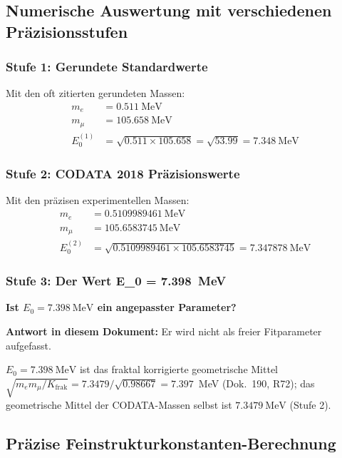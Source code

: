 	\subsection{Numerische Auswertung mit verschiedenen Präzisionsstufen}
	
	\subsubsection{Stufe 1: Gerundete Standardwerte}
	Mit den oft zitierten gerundeten Massen:
	\begin{align}
		m_e &= \SI{0.511}{\MeV} \\
		m_\mu &= \SI{105.658}{\MeV} \\
		E_0^{(1)} &= \sqrt{0.511 \times 105.658} = \sqrt{53.99} = \SI{7.348}{\MeV}
	\end{align}
	
	\subsubsection{Stufe 2: CODATA 2018 Präzisionswerte}
	Mit den präzisen experimentellen Massen:
	\begin{align}
		m_e &= \SI{0.5109989461}{\MeV} \\
		m_\mu &= \SI{105.6583745}{\MeV} \\
		E_0^{(2)} &= \sqrt{0.5109989461 \times 105.6583745} = \SI{7.347878}{\MeV}
	\end{align}
	
	\subsubsection{Stufe 3: Der Wert E\_0 = \SI{7.398}{\MeV}}
	
	\begin{tcolorbox}[colback=yellow!10!white,colframe=orange!75!black,title=Kritische Frage]
		\textbf{Ist $E_0 = \SI{7.398}{\MeV}$ ein angepasster Parameter?}
		
		\textbf{Antwort in diesem Dokument:} Er wird nicht als freier Fitparameter aufgefasst.
		
		$E_0 = \SI{7.398}{\MeV}$ ist das fraktal korrigierte geometrische Mittel $\sqrt{m_e m_\mu/K_{\text{frak}}} = 7.3479/\sqrt{0.98667} = 7.397$~MeV (Dok.~190, R72); das geometrische Mittel der CODATA-Massen selbst ist $\SI{7.3479}{\MeV}$ (Stufe 2).
	\end{tcolorbox}
	
	\subsection{Präzise Feinstrukturkonstanten-Berechnung}
	
